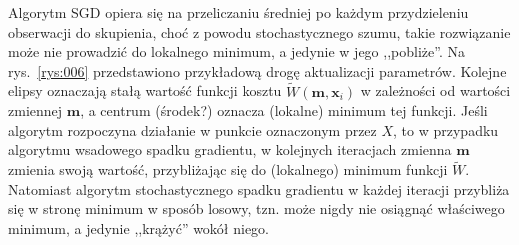 \documentclass{praca1}
\begin{document}
Algorytm SGD opiera się na przeliczaniu średniej po każdym przydzieleniu obserwacji do skupienia, choć z powodu stochastycznego szumu, takie rozwiązanie może nie prowadzić do lokalnego minimum, a jedynie w jego ,,pobliże''. Na rys.~\ref{rys:006} przedstawiono przykładową drogę aktualizacji parametrów. Kolejne elipsy oznaczają stałą wartość funkcji kosztu $\widetilde{W}(\mathbf{m}, \mathbf{x}_i)$ w zależności od wartości zmiennej $\mathbf{m}$, a centrum (środek?) oznacza (lokalne) minimum tej funkcji. Jeśli algorytm rozpoczyna działanie w punkcie oznaczonym przez $X$, to w przypadku algorytmu wsadowego spadku gradientu, w kolejnych iteracjach zmienna $\mathbf{m}$ zmienia swoją wartość, przybliżając się do (lokalnego) minimum funkcji $\widetilde{W}$. Natomiast algorytm stochastycznego spadku gradientu w każdej iteracji przybliża się w stronę minimum w sposób losowy, tzn. może nigdy nie osiągnąć właściwego minimum, a jedynie ,,krążyć'' wokół niego.
 
\end{document}
